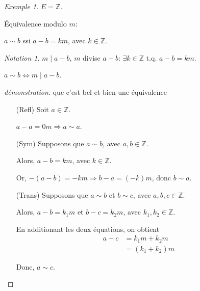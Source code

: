 \documentclass{report}
\newcommand*{\entiers}{\mathbb{Z}}
\theoremstyle{definition}
\theoremstyle{remark}
\newtheorem*{exem}{Exemple}
\newtheorem*{nota}{Notation}
\begin{document}
	\begin{exem}
		$E=\entiers$.

		\'Equivalence modulo $m$:

		$a \sim b$ ssi $a-b=km$, avec $k \in \entiers$.
		\begin{nota}
			$m \mid a-b$, $m$ divise $a-b$: $\exists k \in \entiers$ t.q. $a-b=km$.
		\end{nota}

		$a \sim b \Longleftrightarrow m \mid a-b$.
		\begin{proof}[d\'emonstration]
			que c'est bel et bien une \'equivalence
			\begin{itemize}
				\item[(Refl)] Soit $a \in \entiers$.

				$a-a=0m \Rightarrow a \sim a$.
				\item[(Sym)] Supposons que $a \sim b$, avec $a,b \in \entiers$.

				Alors, $a-b=km$, avec $k \in \entiers$.

				Or, $-(a-b)=-km \Rightarrow b-a=(-k)m$, donc $b \sim a$.
				\item[(Trans)] Supposons que $a \sim b$ et $b \sim c$, avec $a,b,c \in \entiers$.

				Alors, $a-b=k_1m$ et $b-c=k_2m$, avec $k_1,k_2 \in \entiers$.

				En additionant les deux \'equations, on obtient
				\begin{align*}
					a-c&= k_1m+k_2m\\
					&= (k_1+k_2)m
				\end{align*}

				Donc, $a \sim c$.
			\end{itemize}
		\end{proof}


\end{exem}
\end{document}
